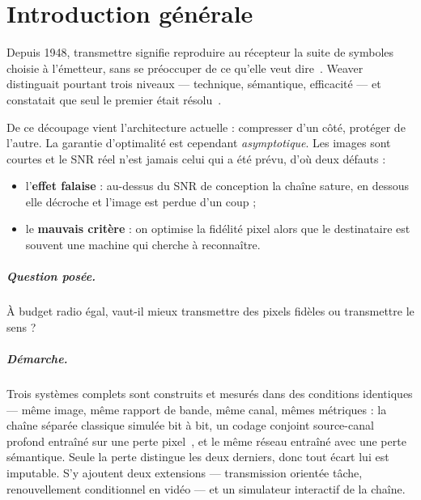 \chapter*{Introduction générale}

Depuis 1948, transmettre signifie reproduire au récepteur la suite de symboles choisie à l'émetteur, sans se
préoccuper de ce qu'elle veut dire~\cite{shannon1948}. Weaver distinguait pourtant trois niveaux — technique,
sémantique, efficacité — et constatait que seul le premier était résolu~\cite{weaver1949}.

De ce découpage vient l'architecture actuelle : compresser d'un côté, protéger de l'autre. La garantie
d'optimalité est cependant \emph{asymptotique}. Les images sont courtes et le SNR réel n'est jamais celui qui
a été prévu, d'où deux défauts :

\begin{itemize}
  \item l'\textbf{effet falaise} : au-dessus du SNR de conception la chaîne sature, en dessous elle décroche et
        l'image est perdue d'un coup ;
  \item le \textbf{mauvais critère} : on optimise la fidélité pixel alors que le destinataire est souvent une
        machine qui cherche à reconnaître.
\end{itemize}

\paragraph{Question posée.} À budget radio égal, vaut-il mieux transmettre des pixels fidèles ou transmettre
le sens ?

\paragraph{Démarche.} Trois systèmes complets sont construits et mesurés dans des conditions identiques —
même image, même rapport de bande, même canal, mêmes métriques : la chaîne séparée classique simulée bit à
bit, un codage conjoint source-canal profond entraîné sur une perte pixel~\cite{bourtsoulatze2019}, et le
même réseau entraîné avec une perte sémantique. Seule la perte distingue les deux derniers, donc tout écart
lui est imputable. S'y ajoutent deux extensions — transmission orientée tâche, renouvellement conditionnel en
vidéo — et un simulateur interactif de la chaîne.

